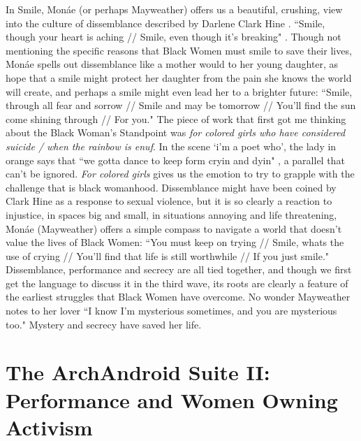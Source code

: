 \documentclass[a4paper, 11pt]{article} %
\begin{document}
In Smile, Mon\'ae (or perhaps Mayweather) offers us a beautiful, crushing, view into the culture of dissemblance described by Darlene Clark Hine \cite{hine}.
``Smile, though your heart is aching // Smile, even though it's breaking" \cite{smile}.
Though not mentioning the specific reasons that Black Women must smile to save their lives, Mon\'ae spells out dissemblance like a mother would to her young daughter, as hope that a smile might protect her daughter from the pain she knows the world will create, and perhaps a smile might even lead her to a brighter future:
``Smile, through all fear and sorrow // Smile and may be tomorrow // You'll find the sun come shining through // For you." \cite{smile}
The piece of work that first got me thinking about the Black Woman's Standpoint was \emph{for colored girls who have considered suicide / when the rainbow is enuf}.
In the scene `i'm a poet who', the lady in orange says that ``we gotta dance to keep form cryin and dyin" \cite{forcoloredgirls}, a parallel that can't be ignored.
\emph{For colored girls} gives us the emotion to try to grapple with the challenge that is black womanhood.
Dissemblance might have been coined by Clark Hine as a response to sexual violence, but it is so clearly a reaction to injustice, in spaces big and small, in situations annoying and life threatening, Mon\'ae (Mayweather) offers a simple compass to navigate a world that doesn't value the lives of Black Women:
``You must keep on trying // Smile, whats the use of crying // You'll find that life is still worthwhile // If you just smile." \cite{smile}
Dissemblance, performance and secrecy are all tied together, and though we first get the language to discuss it in the third wave, its roots are clearly a feature of the earliest struggles that Black Women have overcome.
No wonder Mayweather notes to her lover ``I know I'm mysterious sometimes, and you are mysterious too." \cite{primetime}
Mystery and secrecy have saved her life.


\section*{The ArchAndroid Suite II: Performance and Women Owning Activism}
\end{document}
